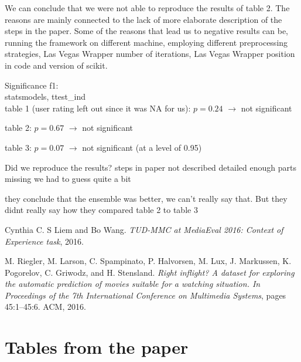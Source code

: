 \documentclass[sigconf]{acmart}
\begin{document}
We can conclude that we were not able to reproduce the results of table 2. The reasons are mainly connected to the lack of more elaborate description of the steps in the paper. Some of the reasons that lead us to negative results can be, running the framework on different machine, employing different preprocessing strategies, Las Vegas Wrapper number of iterations, Las Vegas Wrapper position in code and version of scikit.




Significance f1: \\
statsmodels, ttest\_ind \\

table 1 (user rating left out since it was NA for us): $p = 0.24$
$\rightarrow$ not significant

table 2: $p = 0.67$
$\rightarrow$ not significant

table 3: $p = 0.07$
$\rightarrow$ not significant (at a level of 0.95)
 
 
Did we reproduce the results?
steps in paper not described detailed enough
parts missing
we had to guess quite a bit

they conclude that the ensemble was better, we can't really say that. But they didnt really say how they compared table 2 to table 3





\begin{thebibliography}{2}

 Cynthia C. S Liem and Bo Wang. \textit{TUD-MMC at MediaEval 2016: Context of Experience task}, 2016.

 M. Riegler, M. Larson, C. Spampinato, P. Halvorsen, M. Lux, J. Markussen, K. Pogorelov, C. Griwodz, and H. Stensland. \textit{Right inflight? A dataset for exploring the automatic prediction of movies suitable for a watching situation. In Proceedings of the 7th International Conference on Multimedia Systems}, pages 45:1–45:6. ACM, 2016.

\end{thebibliography}

\newpage
\clearpage
\newpage
\appendix

\section{Tables from the paper}
\end{document}
